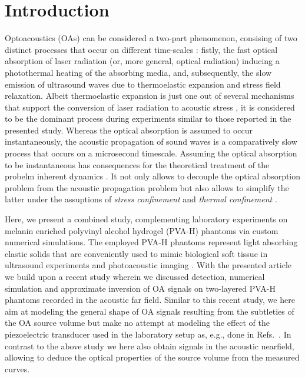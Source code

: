 \documentclass[12pt]{iopart}
\begin{document}
\section{Introduction}
Optoacoustics (OAs) can be considered a two-part phenomenon, consising of two
distinct processes that occur on different time-scales \cite{Kruger:1995}:
fistly, the fast optical absorption of laser radiation (or, more general,
optical radiation) inducing a photothermal heating of the absorbing media, and,
subsequently, the slow emission of ultrasound waves due to thermoelastic
expansion and stress field relaxation.  Albeit thermoelastic expansion is just
one out of several mechanisms that support the conversion of laser radiation to
acoustic stress \cite{Sigrist:1978,Sigrist:1986,Hutchins:1986,Tam:1986}, it is
considered to be the dominant process during experiments similar to those
reported in the presented study.  Whereas the optical absorption is assumed to
occur instantaneously, the acoustic propagation of sound waves is a
comparatively slow process that occurs on a microsecond timescale. 
Assuming the optical absorption to be instantaneous has consequences for the
theoretical treatment of the probelm inherent dynamics
\cite{Diebold:1990,Diebold:1991,Kruger:1995}. It not only allows to decouple
the optical absorption problem from the acoustic propagation problem but also
allows to simplify the latter under the assuptions of \emph{stress confinement}
and \emph{thermal confinement} \cite{Wang:2009}.

Here, we present a combined study, complementing laboratory experiments on
melanin enriched polyvinyl alcohol hydrogel (PVA-H) phantoms via custom
numerical simulations.  The employed PVA-H phantoms represent light absorbing
elastic solids that  are conveniently used to mimic biological soft tissue in
ultrasound experiments and photoacoustic imaging \cite{Xia:2011,Zell:2007}.
With the presented article we build upon a recent study wherein we discussed
detection, numerical simulation and approximate inversion of OA signals
\cite{Blumenroether:2016} on two-layered PVA-H phantoms recorded in the
acoustic far field. Similar to this recent study, we here aim at modeling the
general shape of OA signals resulting from the subtleties of the OA source
volume but make no attempt at modeling the effect of the piezoelectric
transducer used in the laboratory setup as, e.g., done in Refs.\
\cite{Gonzalez:2014,Melchert:2017}.  In contrast to the above study we here
also obtain signals in the acoustic nearfield, allowing to deduce the optical
properties of the source volume from the measured curves.
\end{document}
